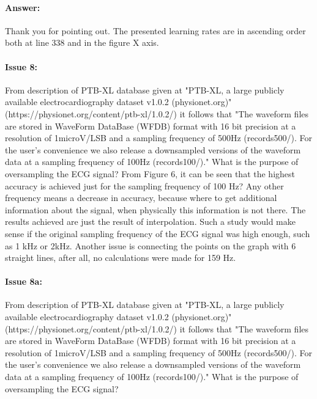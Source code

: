 \documentclass{article}
\begin{document}
\paragraph{Answer:}
Thank you for pointing out. The presented learning rates are in ascending order both at line 338 and in the figure X axis. 

\paragraph{Issue 8:}
\begin{displayquote}
From description of PTB-XL database given at "PTB-XL, a large publicly available electrocardiography dataset v1.0.2 (physionet.org)" (https://physionet.org/content/ptb-xl/1.0.2/) it follows that "The waveform files are stored in WaveForm DataBase (WFDB) format with 16 bit precision at a resolution of 1microV/LSB and a sampling frequency of 500Hz (records500/). For the user’s convenience we also release a downsampled versions of the waveform data at a sampling frequency of 100Hz (records100/)." What is the purpose of oversampling the ECG signal? From Figure 6, it can be seen that the highest accuracy is achieved just for the sampling frequency of 100 Hz? Any other frequency means a decrease in accuracy, because where to get additional information about the signal, when physically this information is not there. The results achieved are just the result of interpolation. Such a study would make sense if the original sampling frequency of the ECG signal was high enough, such as 1 kHz or 2kHz. Another issue is connecting the points on the graph with 6 straight lines, after all, no calculations were made for 159 Hz.
\end{displayquote}

\paragraph{Issue 8a:}
\begin{displayquote}
From description of PTB-XL database given at "PTB-XL, a large publicly available electrocardiography dataset v1.0.2 (physionet.org)" (https://physionet.org/content/ptb-xl/1.0.2/) it follows that "The waveform files are stored in WaveForm DataBase (WFDB) format with 16 bit precision at a resolution of 1microV/LSB and a sampling frequency of 500Hz (records500/). For the user’s convenience we also release a downsampled versions of the waveform data at a sampling frequency of 100Hz (records100/)." What is the purpose of oversampling the ECG signal?  
\end{displayquote}
\end{document}
